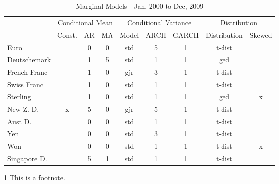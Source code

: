 \documentclass[12pt]{article}
\begin{document}
\begin{table}
	\caption{Marginal Models - Jan, 2000 to Dec, 2009}
	\begin{threeparttable}
		\begin{tabular}[l]{l c c c c c c c c}
	    \hline
	& \multicolumn{3}{c}{Conditional Mean}  & \multicolumn{3}{c}{Conditional Variance}  & \multicolumn{2}{c}{Distribution} \\
			            & Const.     & AR & MA & Model & ARCH & GARCH & Distribution & Skewed     \\
	\hline
	    Euro            & \checkmark & 0  & 0  & std   & 5    & 1     & t-dist       & \checkmark \\
		Deutschemark    & \checkmark & 1  & 5  & std   & 1    & 1     & ged          & \checkmark \\
		French Franc    & \checkmark & 1  & 0  & gjr   & 3    & 1     & t-dist       & \checkmark \\
		Swiss Franc     & \checkmark & 1  & 0  & std   & 1    & 1     & t-dist       & \checkmark \\
		Sterling        & \checkmark & 1  & 0  & std   & 1    & 1     & ged          & x          \\
		New Z. D.       & x          & 5  & 0  & gjr   & 5    & 1     & t-dist       & \checkmark \\
		Aust D.         & \checkmark & 0  & 0  & std   & 1    & 1     & t-dist       & \checkmark \\
		Yen             & \checkmark & 0  & 0  & std   & 3    & 1     & t-dist       & \checkmark \\
		Won             & \checkmark & 0  & 0  & std   & 1    & 1     & t-dist       & x          \\
		Singapore D.    & \checkmark & 5  & 1  & std   & 1    & 1     & t-dist       & \checkmark \\
	\hline
		\end{tabular}
		\begin{tablenotes}
			\item[1]{\footnotesize This is a footnote.}
		\end{tablenotes}
	\end{threeparttable}
\end{table}
\end{document}
